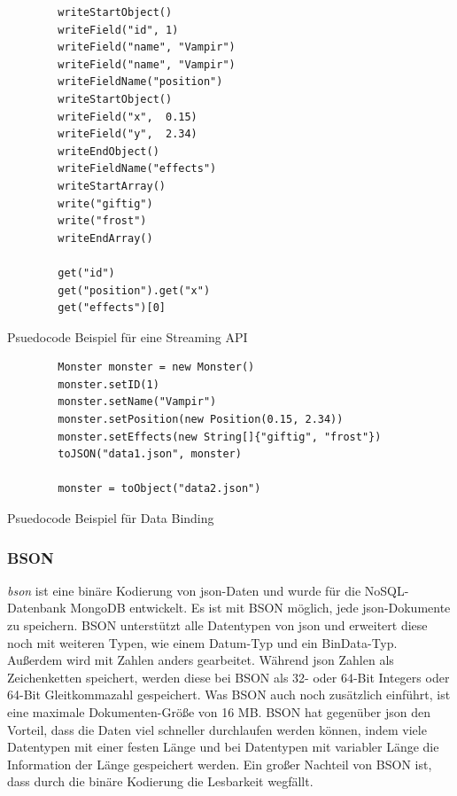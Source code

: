 \begin{listing}[htp]
    \begin{verbatim} 
        writeStartObject()
        writeField("id", 1)
        writeField("name", "Vampir")
        writeField("name", "Vampir")
        writeFieldName("position")
        writeStartObject()
        writeField("x",  0.15) 
        writeField("y",  2.34) 
        writeEndObject()
        writeFieldName("effects")
        writeStartArray()
        write("giftig") 
        write("frost")
        writeEndArray()

        get("id")
        get("position").get("x")
        get("effects")[0]
    \end{verbatim}
    \caption{Psuedocode Beispiel für eine Streaming API}
    \label{lst:streamingApiBsp}
\end{listing}

\begin{listing}[htp]
    \begin{verbatim} 
        Monster monster = new Monster()
        monster.setID(1)
        monster.setName("Vampir")
        monster.setPosition(new Position(0.15, 2.34))
        monster.setEffects(new String[]{"giftig", "frost"})
        toJSON("data1.json", monster)

        monster = toObject("data2.json")
    \end{verbatim}
    \caption{Psuedocode Beispiel für Data Binding}
    \label{lst:dataBindingBsp}
\end{listing}

\subsubsection{BSON}
\textit{\ac{bson}} ist eine binäre Kodierung von \ac{json}-Daten und wurde für die NoSQL-Datenbank MongoDB entwickelt. Es ist mit BSON möglich, jede \ac{json}-Dokumente zu speichern. BSON unterstützt alle Datentypen von \ac{json} und erweitert diese noch mit weiteren Typen, wie einem Datum-Typ und ein BinData-Typ. Außerdem wird mit Zahlen anders gearbeitet. Während \ac{json} Zahlen als Zeichenketten speichert, werden diese bei BSON als 32- oder 64-Bit Integers oder 64-Bit Gleitkommazahl gespeichert. Was BSON auch noch zusätzlich einführt, ist eine maximale Dokumenten-Größe von 16 MB. BSON hat gegenüber \ac{json} den Vorteil, dass die Daten viel schneller durchlaufen werden können, indem viele Datentypen mit einer festen Länge und bei Datentypen mit variabler Länge die Information der Länge gespeichert werden. Ein großer Nachteil von BSON ist, dass durch die binäre Kodierung die Lesbarkeit wegfällt.\cite{bsonspecBSONBinary}\cite{postgreSQLandBSON}\cite{mongodbJSONBSON}

